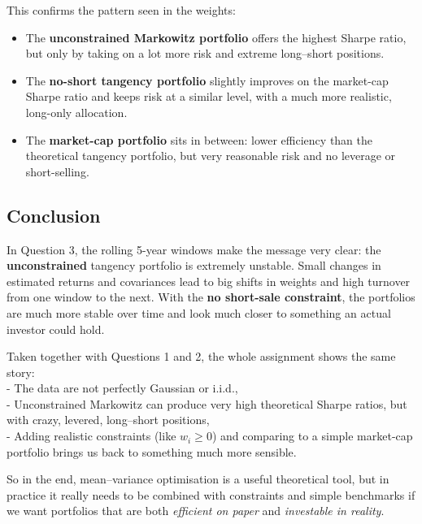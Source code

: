 \documentclass[11pt]{article}
\providecommand{\tightlist}{%
      \setlength{\itemsep}{0pt}\setlength{\parskip}{0pt}}
\begin{document}
This confirms the pattern seen in the weights:

\begin{itemize}
\tightlist
\item
  The \textbf{unconstrained Markowitz portfolio} offers the highest
  Sharpe ratio, but only by taking on a lot more risk and extreme
  long--short positions.
\item
  The \textbf{no-short tangency portfolio} slightly improves on the
  market-cap Sharpe ratio and keeps risk at a similar level, with a much
  more realistic, long-only allocation.
\item
  The \textbf{market-cap portfolio} sits in between: lower efficiency
  than the theoretical tangency portfolio, but very reasonable risk and
  no leverage or short-selling.
\end{itemize}

    \hypertarget{conclusion}{%
\subsection{Conclusion}\label{conclusion}}

In Question 3, the rolling 5-year windows make the message very clear:
the \textbf{unconstrained} tangency portfolio is extremely unstable.
Small changes in estimated returns and covariances lead to big shifts in
weights and high turnover from one window to the next. With the
\textbf{no short-sale constraint}, the portfolios are much more stable
over time and look much closer to something an actual investor could
hold.

Taken together with Questions 1 and 2, the whole assignment shows the
same story:\\
- The data are not perfectly Gaussian or i.i.d.,\\
- Unconstrained Markowitz can produce very high theoretical Sharpe
ratios, but with crazy, levered, long--short positions,\\
- Adding realistic constraints (like \(w_i \ge 0\)) and comparing to a
simple market-cap portfolio brings us back to something much more
sensible.

So in the end, mean--variance optimisation is a useful theoretical tool,
but in practice it really needs to be combined with constraints and
simple benchmarks if we want portfolios that are both \emph{efficient on
paper} and \emph{investable in reality}.


    
    
    
\end{document}
